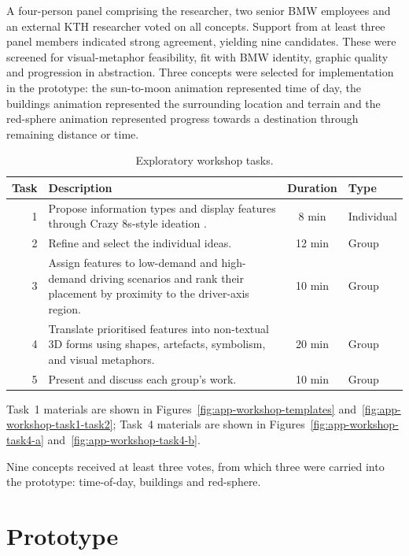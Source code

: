 \documentclass[
english,                 %
bibtex,                  %
includeExtraAbstracts, %
]{kththesis}
\newenvironment{evidenceblock}{\par\addvspace{6pt}\noindent\begin{minipage}{\linewidth}}{\end{minipage}\par\addvspace{6pt}}
\numberwithin{listing}{chapter}
\begin{document}
\begin{evidenceblock}
\normalsize
A four-person panel comprising the researcher, two senior BMW employees and an external KTH researcher voted on all concepts. Support from at least three panel members indicated strong agreement, yielding nine candidates. These were screened for visual-metaphor feasibility, fit with BMW identity, graphic quality and progression in abstraction. Three concepts were selected for implementation in the prototype: the sun-to-moon animation represented time of day, the buildings animation represented the surrounding location and terrain and the red-sphere animation represented progress towards a destination through remaining distance or time.

\begin{table}[H]
\centering
\small
\caption[Exploratory workshop tasks]{Exploratory workshop tasks.}
\label{tab:workshop-tasks}
\begin{tabularx}{\textwidth}{@{}r >{\raggedright\arraybackslash}X c l@{}}
\toprule
Task & Description & Duration & Type \\
\midrule
1 & Propose information types and display features through Crazy 8s-style ideation \cite{googleCrazy8s}. & 8 min & Individual \\
2 & Refine and select the individual ideas. & 12 min & Group \\
3 & Assign features to low-demand and high-demand driving scenarios and rank their placement by proximity to the driver-axis region. & 10 min & Group \\
4 & Translate prioritised features into non-textual 3D forms using shapes, artefacts, symbolism, and visual metaphors. & 20 min & Group \\
5 & Present and discuss each group's work. & 10 min & Group \\
\bottomrule
\end{tabularx}
\end{table}
\end{evidenceblock}

Task~1 materials are shown in Figures~\ref{fig:app-workshop-templates} and~\ref{fig:app-workshop-task1-task2}; Task~4 materials are shown in Figures~\ref{fig:app-workshop-task4-a} and~\ref{fig:app-workshop-task4-b}.

Nine concepts received at least three votes, from which three were carried into the prototype: time-of-day, buildings and red-sphere.

\section{Prototype}
\label{sec:prototype}
\end{document}
